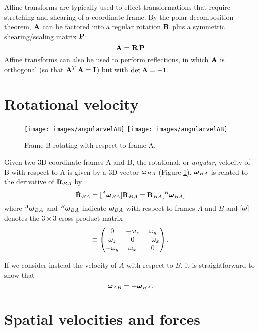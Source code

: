 Affine transforms are typically used to effect transformations that
require stretching and shearing of a coordinate frame.  By the polar
decomposition theorem, $\A$ can be factored into a regular
rotation $\R$ plus a symmetric shearing/scaling matrix $\P$:
%
\begin{equation}
\A = \R \, \P
\end{equation}
%
Affine transforms can also be used to perform reflections, in which
$\A$ is orthogonal (so that $\A^T \, \A = \I$) but with $\det \A =
-1$.

\section{Rotational velocity}

\begin{figure}[ht]
\begin{center}
 \iflatexml
    \texttt{[image: images/angularvelAB]}
 \else
    \texttt{[image: images/angularvelAB]}
 \fi
\end{center}
\caption{Frame B rotating with respect to frame A.}
\label{angularvelAB:fig}
\end{figure}

Given two 3D coordinate frames A and B, the rotational, or {\it
angular}, velocity of B with respect to A is given by a 3D vector
$\Bom_{BA}$ (Figure \ref{angularvelAB:fig}). $\Bom_{BA}$
is related to the derivative of $\R_{BA}$ by
%
\begin{equation}
\dot\R_{BA} = [{}^A\Bom_{BA}] \R_{BA} = \R_{BA} [{}^B\Bom_{BA}]
\end{equation}
%
where ${}^A\Bom_{BA}$ and ${}^B\Bom_{BA}$ indicate $\Bom_{BA}$ with
respect to frames $A$ and $B$ and $[ \Bom ]$ denotes the $3 \times 3$
cross product matrix
%
\begin{equation}
[ \Bom ] \equiv 
\matl
0 & -\omega_z & \omega_y \\
\omega_z & 0 & -\omega_x \\
-\omega_y & \omega_x & 0 \\
\matr.
\label{xprodmatrix:eqn}
\end{equation}
%

If we consider instead the velocity of $A$ with respect to $B$, it is
straightforward to show that
%
\begin{equation}
\Bom_{AB} = -\Bom_{BA}. 
\end{equation}
%

\section{Spatial velocities and forces}
\label{SpatialVelocitiesAndForces:sec}

